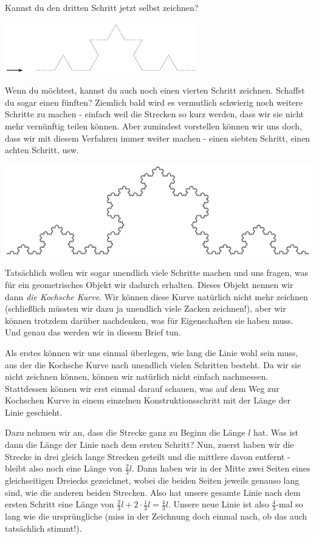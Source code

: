 \documentclass[a4paper,ngerman,12pt]{scrartcl}
\theoremstyle{definition}
\theoremstyle{plain}
\theoremstyle{remark}
\begin{document}
Kannst du den dritten Schritt jetzt selbst zeichnen?

\begin{center}
	\includegraphics[width=.7\textwidth]{Bilder/Schneeflocke-Konstruktion2.pdf}
\end{center}

Wenn du möchtest, kannst du auch noch einen vierten Schritt zeichnen. Schaffst du sogar einen fünften? Ziemlich bald wird es vermutlich schwierig noch weitere Schritte zu machen - einfach weil die Strecken so kurz werden, dass wir sie nicht mehr vernünftig teilen können. Aber zumindest vorstellen können wir uns doch, dass wir mit diesem Verfahren immer weiter machen - einen siebten Schritt, einen achten Schritt, usw. 

\begin{center}
	\includegraphics[width=.5\textwidth]{Bilder/Schneeflocke-Konstruktion3.pdf}
\end{center}

Tatsächlich wollen wir sogar \glqq unendlich viele\grqq{} Schritte machen und uns fragen, was für ein geometrisches Objekt wir dadurch erhalten. Dieses Objekt nennen wir dann \emph{die Kochsche Kurve}. Wir können diese Kurve natürlich nicht mehr zeichnen (schließlich müssten wir dazu ja unendlich viele Zacken zeichnen!), aber wir können trotzdem darüber nachdenken, was für Eigenschaften sie haben muss. Und genau das werden wir in diesem Brief tun. 

Als erstes können wir uns einmal überlegen, wie lang die Linie wohl sein muss, aus der die Kochsche Kurve \glqq nach unendlich vielen Schritten\grqq{} besteht. Da wir sie nicht zeichnen können, können wir natürlich nicht einfach nachmessen. Stattdessen können wir erst einmal darauf schauen, was auf dem Weg zur Kochschen Kurve in einem einzelnen Konstruktionsschritt mit der Länge der Linie geschieht.

Dazu nehmen wir an, dass die Strecke ganz zu Beginn die Länge $l$ hat. Was ist dann die Länge der Linie nach dem ersten Schritt? Nun, zuerst haben wir die Strecke in drei gleich lange Strecken geteilt und die mittlere davon entfernt - bleibt also noch eine Länge von $\frac{2}{3}l$. Dann haben wir in der Mitte zwei Seiten eines gleichseitigen Dreiecks gezeichnet, wobei die beiden Seiten jeweils genauso lang sind, wie die anderen beiden Strecken. Also hat unsere gesamte Linie nach dem ersten Schritt eine Länge von $\frac{2}{3}l + 2\cdot\frac{1}{3}l = \frac{4}{3}l$. Unsere neue Linie ist also $\frac{4}{3}$-mal so lang wie die ursprüngliche (miss in der Zeichnung doch einmal nach, ob das auch tatsächlich stimmt!).
\end{document}
